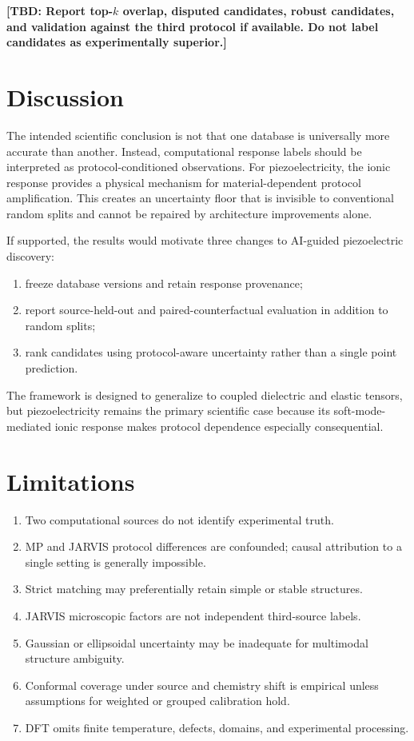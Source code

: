 \documentclass[11pt]{article}
\newcommand{\TBD}[1]{\textcolor{red!75!black}{\textbf{[TBD: #1]}}}
\begin{document}
\TBD{Report top-$k$ overlap, disputed candidates, robust candidates, and validation against the third protocol if available. Do not label candidates as experimentally superior.}

\section{Discussion}

The intended scientific conclusion is not that one database is universally more accurate than another. Instead, computational response labels should be interpreted as protocol-conditioned observations. For piezoelectricity, the ionic response provides a physical mechanism for material-dependent protocol amplification. This creates an uncertainty floor that is invisible to conventional random splits and cannot be repaired by architecture improvements alone.

If supported, the results would motivate three changes to AI-guided piezoelectric discovery:
\begin{enumerate}[leftmargin=1.5em]
    \item freeze database versions and retain response provenance;
    \item report source-held-out and paired-counterfactual evaluation in addition to random splits;
    \item rank candidates using protocol-aware uncertainty rather than a single point prediction.
\end{enumerate}

The framework is designed to generalize to coupled dielectric and elastic tensors, but piezoelectricity remains the primary scientific case because its soft-mode-mediated ionic response makes protocol dependence especially consequential.

\section{Limitations}

\begin{enumerate}[leftmargin=1.5em]
    \item Two computational sources do not identify experimental truth.
    \item MP and JARVIS protocol differences are confounded; causal attribution to a single setting is generally impossible.
    \item Strict matching may preferentially retain simple or stable structures.
    \item JARVIS microscopic factors are not independent third-source labels.
    \item Gaussian or ellipsoidal uncertainty may be inadequate for multimodal structure ambiguity.
    \item Conformal coverage under source and chemistry shift is empirical unless assumptions for weighted or grouped calibration hold.
    \item DFT omits finite temperature, defects, domains, and experimental processing.
\end{enumerate}
\end{document}

